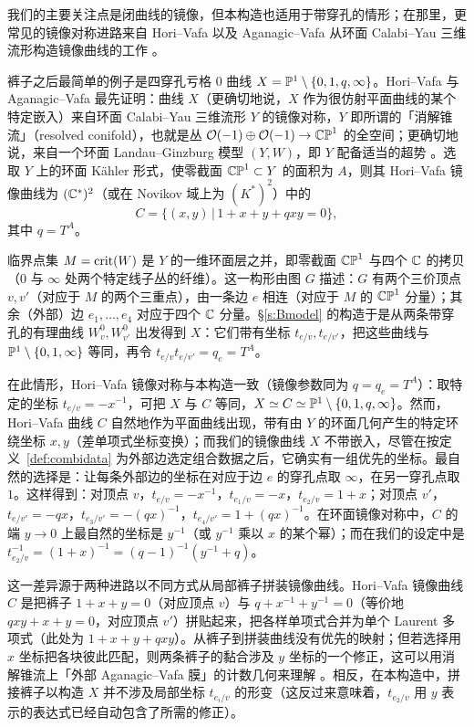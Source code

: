 我们的主要关注点是闭曲线的镜像，但本构造也适用于带穿孔的情形；在那里，更常见的镜像对称进路来自 Hori--Vafa 以及 Aganagic--Vafa 从环面 Calabi--Yau 三维流形构造镜像曲线的工作 \cite{HoriVafa,AV}。

裤子之后最简单的例子是四穿孔亏格 $0$ 曲线 $X=\mathbb{P}^1\setminus\{0,1,q,\infty\}$。Hori--Vafa \cite{HoriVafa} 与 Aganagic--Vafa \cite{AV} 最先证明：曲线 $X$（更确切地说，$X$ 作为很仿射平面曲线的某个特定嵌入）来自环面 Calabi--Yau 三维流形 $Y$ 的镜像对称，$Y$ 即所谓的「消解锥流」（resolved conifold），也就是丛 $\mathcal{O}(-1)\oplus\mathcal{O}(-1)\to\mathbb{CP}^1$ 的全空间；更确切地说，来自一个环面 Landau--Ginzburg 模型 $(Y,W)$，即 $Y$ 配备适当的超势 \cite{ChanLauLeung,AAK}。选取 $Y$ 上的环面 K\"ahler 形式，使零截面 $\mathbb{CP}^1\subset Y$ 的面积为 $A$，则其 Hori--Vafa 镜像曲线为 $(\mathbb{C}^*)^2$（或在 Novikov 域上为 $(K^*)^2$）中的
\[
C=\{(x,y)\,|\,1+x+y+qxy=0\},
\]
其中 $q=T^A$。

临界点集 $M=\operatorname{crit}(W)$ 是 $Y$ 的一维环面层之并，即零截面 $\mathbb{CP}^1$ 与四个 $\mathbb{C}$ 的拷贝（$0$ 与 $\infty$ 处两个特定线子丛的纤维）。这一构形由图 $G$ 描述：$G$ 有两个三价顶点 $v,v'$（对应于 $M$ 的两个三重点），由一条边 $e$ 相连（对应于 $M$ 的 $\mathbb{CP}^1$ 分量）；其余（外部）边 $e_1,\dots,e_4$ 对应于四个 $\mathbb{C}$ 分量。§\ref{s:Bmodel} 的构造于是从两条带穿孔的有理曲线 $W^0_v,W^0_{v'}$ 出发得到 $X$：它们带有坐标 $t_{e/v},t_{e/v'}$，把这些曲线与 $\mathbb{P}^1\setminus\{0,1,\infty\}$ 等同，再令 $t_{e/v}t_{e/v'}=q_e=T^A$。

在此情形，Hori--Vafa 镜像对称与本构造一致（镜像参数同为 $q=q_e=T^A$）：取特定的坐标 $t_{e/v}=-x^{-1}$，可把 $X$ 与 $C$ 等同，$X\simeq C\simeq\mathbb{P}^1\setminus\{0,1,q,\infty\}$。然而，Hori--Vafa 曲线 $C$ 自然地作为平面曲线出现，带有由 $Y$ 的环面几何产生的特定环绕坐标 $x,y$（差单项式坐标变换）；而我们的镜像曲线 $X$ 不带嵌入，尽管在按定义~\ref{def:combidata} 为外部边选定组合数据之后，它确实有一组优先的坐标。最自然的选择是：让每条外部边的坐标在对应于边 $e$ 的穿孔点取 $\infty$，在另一穿孔点取 $1$。这样得到：对顶点 $v$，$t_{e/v}=-x^{-1}$，$t_{e_1/v}=-x$，$t_{e_2/v}=1+x$；对顶点 $v'$，$t_{e/v'}=-qx$，$t_{e_3/v'}=-(qx)^{-1}$，$t_{e_4/v'}=1+(qx)^{-1}$。在环面镜像对称中，$C$ 的端 $y\to 0$ 上最自然的坐标是 $y^{-1}$（或 $y^{-1}$ 乘以 $x$ 的某个幂）；而在我们的设定中是 $t_{e_2/v}^{-1}=(1+x)^{-1}=(q-1)^{-1}(y^{-1}+q)$。

这一差异源于两种进路以不同方式从局部裤子拼装镜像曲线。Hori--Vafa 镜像曲线 $C$ 是把裤子 $1+x+y=0$（对应顶点 $v$）与 $q+x^{-1}+y^{-1}=0$（等价地 $qxy+x+y=0$，对应顶点 $v'$）拼贴起来，把各样单项式合并为单个 Laurent 多项式（此处为 $1+x+y+qxy$）。从裤子到拼装曲线没有优先的映射；但若选择用 $x$ 坐标把各块彼此匹配，则两条裤子的黏合涉及 $y$ 坐标的一个修正，这可以用消解锥流上「外部 Aganagic--Vafa 膜」的计数几何来理解 \cite{AV}。相反，在本构造中，拼接裤子以构造 $X$ 并不涉及局部坐标 $t_{e_i/v}$ 的形变（这反过来意味着，$t_{e_2/v}$ 用 $y$ 表示的表达式已经自动包含了所需的修正）。

